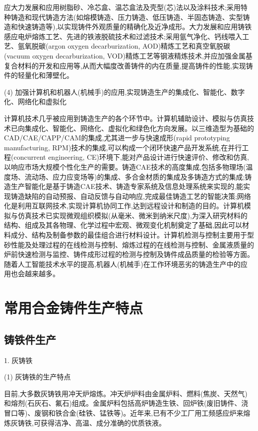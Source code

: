 \documentclass[UTF8]{ctexbook}
\newcommand{\◎}{\ensuremath{\bigcirc}}
\begin{document}
应大力发展和应用树脂砂、冷芯盒、温芯盒法及壳型(芯)法以及涂料技术;采用特种铸造和现代铸造方法(如熔模铸造、压力铸造、低压铸造、半固态铸造、实型铸造和快速铸造等),以实现铸件外观质量的精确化及近净成形。大力发展和应用铸铁感应电炉熔炼工艺、先进的铁液脱硫技术和过滤技术;采用氩气净化、钙线喂入工艺、氩氧脱碳(argon oxygen decarburization, AOD)精炼工艺和真空氧脱碳(vacuum oxygen decarburization, VOD)精炼工艺等钢液精炼技术,并应加强金属基复合材料的开发和应用等,从而大幅度改善铸件的内在质量,提高铸件的性能,实现铸件的轻量化和薄壁化。

(4) 加强计算机和机器人(机械手)的应用,实现铸造生产的集成化、智能化、数字化、网络化和虚拟化

计算机技术几乎被应用到铸造生产的各个环节中。计算机辅助设计、模拟与仿真技术已向集成化、智能化、网络化、虚拟化和绿色化方向发展。以三维造型为基础的CAD/CAE/CAPP/CAM的集成,尤其进一步与快速成形(rapid prototyping manufacturing, RPM)技术的集成,可以构成一个闭环快速产品开发系统,在并行工程(concurrent engineering, CE)环境下,能对产品设计进行快速评价、修改和仿真,以响应市场大规模个性化生产的需要。铸造CAE技术的高度集成,包括多物理场(温度场、流动场、应力应变场等)的集成、多合金材质的集成及多铸造方式的集成;铸造生产智能化是基于铸造CAE技术、铸造专家系统及信息处理系统来实现的,能实现铸造缺陷的自动预报、自动反馈与自动响应,完成最佳铸造工艺的智能决策;网络化是利用互联网技术,实现计算机协同工作,达到远程设计和制造的目的。计算机模拟与仿真技术已实现微观组织模拟(从毫米、微米到纳米尺度),为深入研究材料的结构、组成及其各物理、化学过程中宏观、微观变化机制奠定了基础,因此可以材料成分、结构及制备参数的最佳组合进行材料设计。计算机检测与控制主要用于型砂性能及处理过程的在线检测与控制、熔炼过程的在线检测与控制、金属液质量的炉前快速检测与监控、铸件成形过程的检测与控制及铸件成品质量的检验等方面。随着人工智能技术水平的提高,机器人(机械手)在工作环境恶劣的铸造生产中的应用也会越来越多。

\section{常用合金铸件生产特点}

\subsection{铸铁件生产}

1. 灰铸铁

(1) 灰铸铁的生产特点

目前,大多数灰铸铁用冲天炉熔炼。冲天炉炉料由金属炉料、燃料(焦炭、天然气)和熔剂(石灰石、氟石)组成。金属炉料包括高炉铸造生铁、回炉铁(废旧铸件、浇冒口等)、废钢和铁合金(硅铁、锰铁等)。近年来,已有不少工厂用工频感应炉来熔炼灰铸铁,可获得洁净、高温、成分准确的优质铁液。
\end{document}
